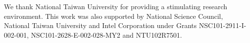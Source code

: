 \begin{acknowledgements}
We thank National Taiwan University for providing a stimulating research environment.
This work was also supported by National Science Council, National Taiwan University and Intel Corporation under Grants NSC101-2911-I-002-001, NSC101-2628-E-002-028-MY2 and NTU102R7501.
\end{acknowledgements}
